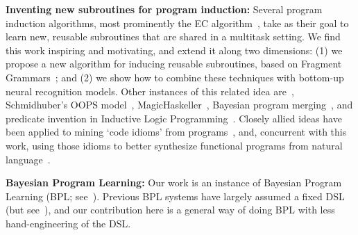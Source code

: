 \documentclass{article}
\begin{document}
 \noindent \textbf{Inventing new subroutines for program induction:}
 Several program induction algorithms, most prominently the EC algorithm~\cite{Dechter:2013:BLV:2540128.2540316}, take as their goal to learn new, reusable subroutines that are shared in a multitask setting. We find this work inspiring and motivating,
 and extend it along two dimensions: (1) we propose a new algorithm for
 inducing reusable subroutines, based on Fragment Grammars~\cite{tim};
 and (2) we show how to combine these techniques with bottom-up neural recognition models.
 Other instances of this related idea are~\cite{DBLP:conf/icml/LiangJK10}, Schmidhuber's OOPS model~\cite{schmidhuber2004optimal}, MagicHaskeller~\cite{katayama2015towards}, Bayesian program merging~\cite{hwang2011inducing}, and predicate invention in Inductive Logic Programming~\cite{DBLP:conf/ecai/LinDETM14}.
 Closely allied ideas have been applied to mining `code idioms' from  programs~\cite{Allamanis:2014:MIS:2635868.2635901}, and, concurrent with this work, using those idioms to better synthesize functional programs from natural language~\cite{Alex}.
 
 
\noindent\textbf{Bayesian Program
 Learning:} Our work is an instance of
 Bayesian Program
 Learning (BPL; see~\citep{lake2015human,Dechter:2013:BLV:2540128.2540316,ellis2016sampling,DBLP:conf/icml/LiangJK10,ellis2015unsupervised}). Previous BPL systems have largely assumed a fixed DSL (but see~\cite{DBLP:conf/icml/LiangJK10}),
 and our contribution here is a general way of doing BPL with less hand-engineering of the DSL.
 

 
\end{document}
